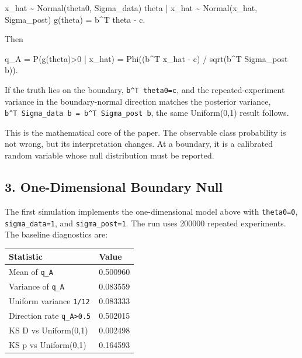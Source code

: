 \documentclass[
]{article}
\newenvironment{Shaded}{}{}
\newcommand{\NormalTok}[1]{#1}
\newcounter{none} %
\begin{document}
\begin{Shaded}
\begin{Highlighting}[]
\NormalTok{x\_hat \textasciitilde{} Normal(theta0, Sigma\_data)}
\NormalTok{theta | x\_hat \textasciitilde{} Normal(x\_hat, Sigma\_post)}
\NormalTok{g(theta) = b\^{}T theta {-} c.}
\end{Highlighting}
\end{Shaded}

Then

\begin{Shaded}
\begin{Highlighting}[]
\NormalTok{q\_A = P(g(theta)\textgreater{}0 | x\_hat)}
\NormalTok{    = Phi((b\^{}T x\_hat {-} c) / sqrt(b\^{}T Sigma\_post b)).}
\end{Highlighting}
\end{Shaded}

If the truth lies on the boundary, \texttt{b\^{}T\ theta0=c}, and the
repeated-experiment variance in the boundary-normal direction matches
the posterior variance,
\texttt{b\^{}T\ Sigma\_data\ b\ =\ b\^{}T\ Sigma\_post\ b}, the same
Uniform(0,1) result follows.

This is the mathematical core of the paper. The observable class
probability is not wrong, but its interpretation changes. At a boundary,
it is a calibrated random variable whose null distribution must be
reported.

\subsection{3. One-Dimensional Boundary
Null}\label{one-dimensional-boundary-null}

The first simulation implements the one-dimensional model above with
\texttt{theta0=0}, \texttt{sigma\_data=1}, and \texttt{sigma\_post=1}.
The run uses 200000 repeated experiments. The baseline diagnostics are:

{\def\LTcaptype{none} %
\begin{longtable}[]{@{}ll@{}}
\toprule\noalign{}
Statistic & Value \\
\midrule\noalign{}
\endhead
\bottomrule\noalign{}
\endlastfoot
Mean of \texttt{q\_A} & 0.500960 \\
Variance of \texttt{q\_A} & 0.083559 \\
Uniform variance \texttt{1/12} & 0.083333 \\
Direction rate \texttt{q\_A\textgreater{}0.5} & 0.502015 \\
KS D vs Uniform(0,1) & 0.002498 \\
KS p vs Uniform(0,1) & 0.164593 \\
\end{longtable}
}
\end{document}
